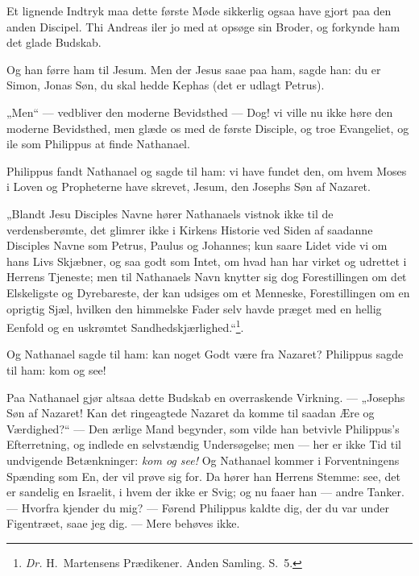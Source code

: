 \documentclass[12pt,a4paper]{book}
\begin{document}
Et lignende Indtryk maa dette første Møde sikkerlig ogsaa have gjort paa den anden
Discipel. Thi Andreas iler jo med at opsøge sin Broder, og forkynde ham det glade Budskab.

\begingroup\large
Og han førre ham til Jesum. Men der Jesus saae paa ham, sagde han: du er Simon, Jonas
Søn, du skal hedde Kephas (det er udlagt Petrus).
\par\endgroup

„Men“ --- vedbliver den moderne Bevidsthed --- Dog! vi ville nu ikke høre den moderne
Bevidsthed, men glæde os med de første Disciple, og troe Evangeliet, og ile som Philippus
at finde Nathanael.

\begingroup\large
Philippus fandt Nathanael og sagde til ham: vi have fundet den, om hvem Moses i Loven og
Propheterne have skrevet, Jesum, den Josephs Søn af Nazaret.
\par\endgroup

„Blandt Jesu Disciples Navne hører Nathanaels vistnok ikke til de verdensberømte, det
glimrer ikke i Kirkens Historie ved Siden af saadanne Disciples Navne som Petrus, Paulus
og Johannes; kun saare Lidet vide vi om hans Livs Skjæbner, og saa godt som Intet, om
hvad han har virket og udrettet i Herrens Tjeneste; men til Nathanaels Navn knytter sig
dog Forestillingen om det Elskeligste og Dyrebareste, der kan udsiges om et Menneske,
Forestillingen om en oprigtig Sjæl, hvilken den himmelske Fader selv
havde præget med en hellig Eenfold og en uskrømtet Sandhedskjærlighed.“\footnote{%
  \textit{Dr.} H.\ Martensens Prædikener. Anden Samling. S.\ 5.%
}.

\begingroup\large
Og Nathanael sagde til ham: kan noget Godt være fra Nazaret? Philippus sagde til ham: kom
og see!
\par\endgroup

Paa Nathanael gjør altsaa dette Budskab en overraskende Virkning. --- „Josephs Søn af
Nazaret! Kan det ringeagtede Nazaret da komme til saadan Ære og Værdighed?“ --- Den
ærlige Mand begynder, som vilde han betvivle Philippus's Efterretning, og indlede en
selvstændig Undersøgelse; men --- her er ikke Tid til undvigende Betænkninger:
\emph{kom og see!} Og Nathanael kommer i Forventningens Spænding som En, der vil prøve
sig for. Da hører han Herrens Stemme: {\large see, det er sandelig en Israelit, i hvem
der ikke er Svig;} og nu faaer han --- andre Tanker. --- {\large Hvorfra kjender du mig?
--- Førend Philippus kaldte dig, der du var under Figentræet, saae jeg dig.} --- Mere
behøves ikke.
\end{document}

